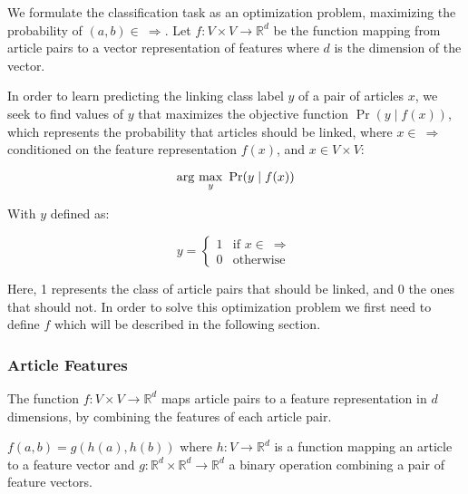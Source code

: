 We formulate the classification task as an optimization problem, maximizing the probability of $(a,b) \in \ \Rightarrow$. Let $f: V\times V \to \mathbb{R}^d$ be the function mapping from article pairs to a vector representation of features where $d$ is the dimension of the vector.

In order to learn predicting the linking class label $y$ of a pair of articles $x$,
we seek to find values of $y$ that maximizes the objective function $\Pr(y \mid f(x))$, which represents the probability that articles should be linked, where $x \in \ \Rightarrow$ conditioned on the feature representation $f(x)$, and $x \in V \times V$:

\begin{equation}
\label{objective}
\arg\ \!\max_y\ \Pr(y \mid f(x))
\end{equation}

With $y$ defined as:

\[
    y=
\begin{cases}
    1 & \text{if } x \in \  \Rightarrow\\
    0 & \text{otherwise}
\end{cases}
\]

Here, 1 represents the class of article pairs that should be linked, and 0 the ones that should not.
In order to solve this optimization problem we first need to define $f$ which will be described in the following section.

\subsubsection{Article Features}

The function $f: V\times V \to \mathbb{R}^d$ maps article pairs to a feature representation in $d$ dimensions, by combining the features of each article pair.

$f(a,b) = g(h(a), h(b))$ where $h: V \to \mathbb{R}^d$ is a function mapping an article to a feature vector and $g: \mathbb{R}^d \times \mathbb{R}^d \to \mathbb{R}^d$ a binary operation combining a pair of feature vectors.

